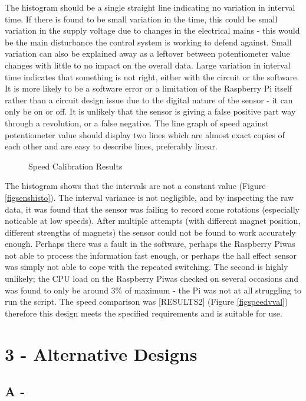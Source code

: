 \documentclass[a4]{report}
\def\br{\newline \newline \noindent}
\def\rpi{Raspberry Pi}
\begin{document}
The histogram should be a single straight line indicating no variation in interval time. If there is found to be small variation in the time, this could be small variation in the supply voltage due to changes in the electrical mains - this would be the main disturbance the control system is working to defend against. Small variation can also be explained away as a leftover between potentiometer value changes with little to no impact on the overall data. Large variation in interval time indicates that something is not right, either with the circuit or the software. It is more likely to be a software error or a limitation of the Raspberry Pi itself rather than a circuit design issue due to the digital nature of the sensor - it can only be on or off. It is unlikely that the sensor is giving a false positive part way through a revolution, or a false negative. \newline \newline \noindent
The line graph of speed against potentiometer value should display two lines which are almost exact copies of each other and are easy to describe lines, preferably linear.\br
	\begin{figure}[!htb]
		\centering
		\label{fig2speeds}
		\caption{Speed Calibration Results}
	\end{figure} \newline  \noindent
	The histogram shows that the intervals are not a constant value (Figure \ref{figsenshisto}). The interval variance is not negligible, and by inspecting the raw data, it was found that the sensor was failing to record some rotations (especially noticable at low speeds). After multiple attempts (with different magnet position, different strengths of magnets) the sensor could not be found to work accurately enough. Perhaps there was a fault in the software, perhaps the \rpi was not able to process the information fast enough, or perhaps the hall effect sensor was simply not able to cope with the repeated switching. The second is highly unlikely; the CPU load on the \rpi was checked on several occasions and was found to only be around 3\% of maximum - the Pi was not at all struggling to run the script.\br
	The speed comparison was [RESULTS2] (Figure \ref{figspeedvval}) therefore this design meets the specified requirements and is suitable for use.
\section{3 - Alternative Designs}
\subsection{A - }
\end{document}

